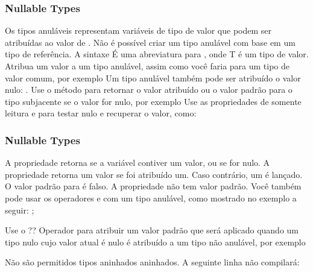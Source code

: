 \documentclass{beamer}
\begin{document}
\begin{frame}[fragile]
\frametitle{Nullable Types}
\begin{outline}
	\1 Os tipos anuláveis representam variáveis de tipo de valor que podem ser atribuídas ao valor de . 
		\2 Não é possível criar um tipo anulável com base em um tipo de referência.
	\1 A sintaxe  É uma abreviatura para , onde T é um tipo de valor. 
	\1 Atribua um valor a um tipo anulável, assim como você faria para um tipo de valor comum, por exemplo 
	\1 Um tipo anulável também pode ser atribuído o valor nulo: .
	\1 Use o método  para retornar o valor atribuído ou o valor padrão para o tipo subjacente se o valor for nulo, por exemplo 
	\1 Use as propriedades de somente leitura  e  para testar nulo e recuperar o valor, como: 

\end{outline}
\end{frame}
\begin{frame}[fragile]
\frametitle{Nullable Types}
\begin{outline}

	\1 A propriedade  retorna  se a variável contiver um valor, ou  se for nulo.
	\2 A propriedade  retorna um valor se foi atribuído um. Caso contrário, um  é lançado.
	\2 O valor padrão para  é falso. A propriedade  não tem valor padrão.
	\2 Você também pode usar os operadores \codef{==} e \codef{! =} com um tipo anulável, como mostrado no exemplo a seguir: ;

	\1 Use o ?? Operador para atribuir um valor padrão que será aplicado quando um tipo nulo cujo valor atual é nulo é atribuído a um tipo não anulável, por exemplo 

	\1 Não são permitidos tipos aninhados aninhados. A seguinte linha não compilará: 
\end{outline}
\end{frame}
\end{document}

